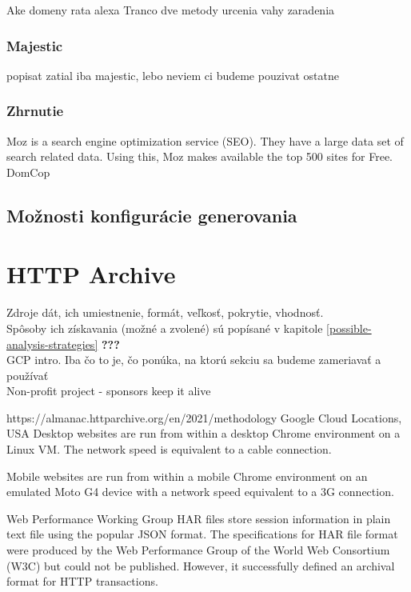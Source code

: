 Ake domeny rata alexa
Tranco dve metody urcenia vahy zaradenia

\subsubsection{Majestic}

popisat zatial iba majestic, lebo neviem ci budeme pouzivat ostatne


\subsubsection{Zhrnutie}

Moz is a search engine optimization service (SEO). They have a large data set of search related data. Using this, Moz makes available the top 500 sites for Free.
DomCop

\subsection{Možnosti konfigurácie generovania}



\section{HTTP Archive}

Zdroje dát, ich umiestnenie, formát, veľkosť, pokrytie, vhodnosť.
\\
Spôsoby ich získavania (možné a zvolené) sú popísané v kapitole \ref{possible-analysis-strategies} \textbf{???}
\\
GCP intro. Iba čo to je, čo ponúka, na ktorú sekciu sa budeme zameriavať a používať
\\
Non-profit project - sponsors keep it alive

https://almanac.httparchive.org/en/2021/methodology
Google Cloud Locations, USA
Desktop websites are run from within a desktop Chrome environment on a Linux VM. The network speed is equivalent to a cable connection.

Mobile websites are run from within a mobile Chrome environment on an emulated Moto G4 device with a network speed equivalent to a 3G connection.

Web Performance Working Group
HAR files store session information in plain text file using the popular JSON format. The specifications for HAR file format were produced by the Web Performance Group of the World Web Consortium (W3C) but could not be published. However, it successfully defined an archival format for HTTP transactions.

